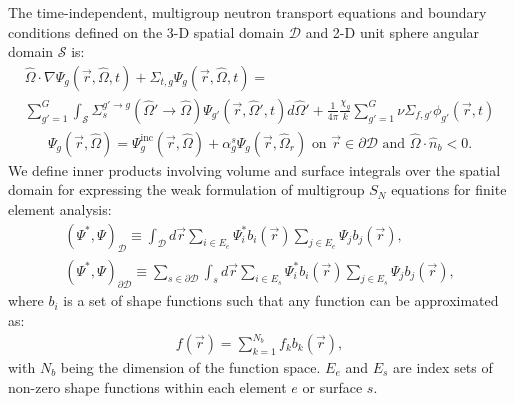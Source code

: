 \documentclass[letterpaper]{mc2025}
\begin{document}
The time-independent, multigroup neutron transport equations and boundary conditions defined on the
3-D spatial domain $\mathcal{D}$ and 2-D unit sphere angular domain $\mathcal{S}$ is:
%
\begin{multline}
  \hat{\Omega}\cdot\nabla\Psi_g(\vec{r},\hat{\Omega},t) + \Sigma_{t,g}
  \Psi_g(\vec{r},\hat{\Omega},t) = \\
  \sum^G_{g'=1}\int_\mathcal{S} \Sigma_s^{g'\rightarrow g}(\hat{\Omega}'\rightarrow\hat{\Omega})
  \Psi_{g'}(\vec{r},\hat{\Omega}',t)d\hat{\Omega}'
  + \frac{1}{4\pi}\frac{\chi_{g}}{k}\sum^G_{g'=1} \nu\Sigma_{f,g'} \phi_{g'}(\vec{r},t)
  \label{eq:mg-nte}
\end{multline}
%
\begin{gather}
  \Psi_g(\vec{r},\hat{\Omega}) = \Psi^\text{inc}_g(\vec{r},\hat{\Omega}) +
  \alpha^s_g\Psi_g(\vec{r},\hat{\Omega}_r)
  \mbox{ on } \vec{r} \in \partial\mathcal{D} \mbox{ and } \hat{\Omega}\cdot\hat{n}_b < 0.
  \label{eq:mg-nte-bc}
\end{gather}
%
We define inner products involving volume and surface integrals over the spatial domain for
expressing the weak formulation of multigroup $S_N$ equations for finite element analysis:
%
\begin{gather}
  \left(\Psi^*, \Psi\right)_\mathcal{D} \equiv \int_\mathcal{D}d\vec{r}
  \sum_{i\in E_e}\Psi^*_i b_i(\vec{r})\sum_{j\in E_e}\Psi_jb_j(\vec{r}), \\
  \left(\Psi^*, \Psi\right)_{\partial\mathcal{D}} \equiv
  \sum_{s\in\partial\mathcal{D}}\int_s d\vec{r}\sum_{i\in E_s}\Psi^*_i b_i(\vec{r})\sum_{j\in E_s}
  \Psi_j b_j(\vec{r}),
\end{gather}
%
where $b_i$ is a set of shape functions such that any function can be approximated as:
%
\begin{gather}
  f(\vec{r}) = \sum^{N_b}_{k=1}f_k b_k(\vec{r}),
\end{gather}
%
with $N_b$ being the dimension of the function space. $E_e$ and $E_s$ are index sets of non-zero
shape functions within each element $e$ or surface $s$.
\end{document}
